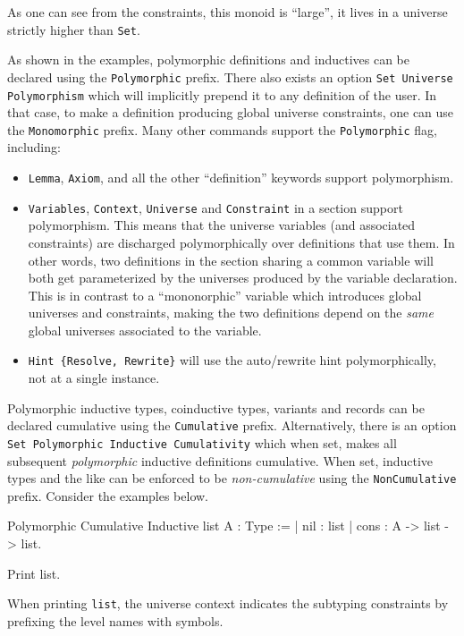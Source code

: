 As one can see from the constraints, this monoid is ``large'', it lives
in a universe strictly higher than \texttt{Set}.


As shown in the examples, polymorphic definitions and inductives can be
declared using the \texttt{Polymorphic} prefix. There also exists an
option \texttt{Set Universe Polymorphism} which will implicitly prepend
it to any definition of the user. In that case, to make a definition
producing global universe constraints, one can use the
\texttt{Monomorphic} prefix. Many other commands support the
\texttt{Polymorphic} flag, including:

\begin{itemize}
\item \texttt{Lemma}, \texttt{Axiom}, and all the other ``definition''
  keywords support polymorphism.
\item \texttt{Variables}, \texttt{Context}, \texttt{Universe} and
  \texttt{Constraint} in a section support polymorphism.  This means
  that the universe variables (and associated constraints) are
  discharged polymorphically over definitions that use them. In other
  words, two definitions in the section sharing a common variable will
  both get parameterized by the universes produced by the variable
  declaration. This is in contrast to a ``mononorphic'' variable which
  introduces global universes and constraints, making the two
  definitions depend on the \emph{same} global universes associated to
  the variable.
\item \texttt{Hint \{Resolve, Rewrite\}} will use the auto/rewrite hint
  polymorphically, not at a single instance.
\end{itemize}


Polymorphic inductive types, coinductive types, variants and records can be
declared cumulative using the \texttt{Cumulative} prefix. Alternatively,
there is an option \texttt{Set Polymorphic Inductive Cumulativity} which when set,
makes all subsequent \emph{polymorphic} inductive definitions cumulative.  When set,
inductive types and the like can be enforced to be
\emph{non-cumulative} using the \texttt{NonCumulative} prefix. Consider the examples below.
\begin{coq_example*}
Polymorphic Cumulative Inductive list {A : Type} :=
| nil : list
| cons : A -> list -> list.
\end{coq_example*}
\begin{coq_example}
Print list.
\end{coq_example}
When printing \texttt{list}, the universe context indicates the
subtyping constraints by prefixing the level names with symbols.


